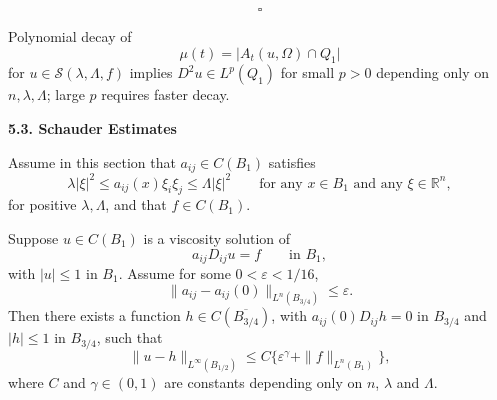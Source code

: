 \[
\square
\]

\begin{remark}\label{hanlin:ch05-rem-5-17} Polynomial decay of
\[
\mu(t) = \lvert A_t(u,\Omega)\cap Q_1\rvert
\]
for $u\in\mathcal S(\lambda,\Lambda,f)$ implies $D^2u\in L^p(Q_1)$ for small $p>0$ depending only on $n,\lambda,\Lambda$; large $p$ requires faster decay.
\end{remark}

\begin{center}
\textbf{5.3. Schauder Estimates}
\end{center}

Assume in this section that $a_{ij}\in C(B_1)$ satisfies
\[
\lambda |\xi|^2 \leq a_{ij}(x)\xi_i\xi_j \leq \Lambda |\xi|^2 \qquad \text{for any }x\in B_1\text{ and any }\xi\in \mathbb R^n,
\]
for positive $\lambda,\Lambda$, and that $f\in C(B_1)$.

\begin{lemma}\label{hanlin:ch05-lem-5-18} Suppose $u \in C(B_1)$ is a viscosity solution of
\[
a_{ij}D_{ij}u=f \qquad \text{in } B_1,
\]
with $|u| \leq 1$ in $B_1$. Assume for some $0<\varepsilon<1/16$,
\[
\|a_{ij}-a_{ij}(0)\|_{L^n(B_{3/4})}\leq \varepsilon.
\]
Then there exists a function $h \in C(\overline{B_{3/4}})$, with $a_{ij}(0)D_{ij}h=0$ in $B_{3/4}$ and $|h|\leq 1$ in $B_{3/4}$, such that
\[
\|u-h\|_{L^\infty(B_{1/2})}\leq C\{\varepsilon^\gamma+\|f\|_{L^n(B_1)}\},
\]
where $C$ and $\gamma\in(0,1)$ are constants depending only on $n$, $\lambda$ and $\Lambda$.
\end{lemma}

